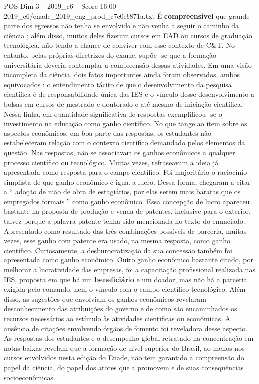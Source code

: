\begin{textsample}{POS Dim 3 – 2019\_c6 – Score 16.00 – 2019\_c6/enade\_2019\_eng\_prod\_c7c0e9871a.txt}
É \textbf{compreensível} que grande parte dos egressos não tenha se envolvido e não venha a seguir o caminho da ciência ; além disso, muitos deles fizeram cursos em EAD ou cursos de graduação tecnológica, não tendo a chance de conviver com esse contexto de C\&T.
No entanto, pelas próprias diretrizes do exame, supõe -se que a formação universitária deveria contemplar a compreensão dessas atividades.
Em uma visão incompleta da ciência, dois fatos importantes ainda foram observados, ambos equivocados : o entendimento tácito de que o desenvolvimento da pesquisa científica é de responsabilidade única das IES e o vínculo desse desenvolvimento a bolsas em cursos de mestrado e doutorado e até mesmo de iniciação científica.
Nessa linha, em quantidade significativa de respostas exemplificou -se o investimento na educação como ganho científico.
No que tange ao item sobre os aspectos econômicos, em boa parte das respostas, os estudantes não estabeleceram relação com o contexto científico demandado pelos elementos da questão.
Nas respostas, não se associavam os ganhos econômicos a qualquer processo científico ou tecnológico.
Muitas vezes, refraseavam a ideia já apresentada como resposta para o campo científico.
Foi majoritário o raciocínio simplista de que ganho econômico é igual a lucro.
Dessa forma, chegaram a citar a “ adoção de mão de obra de estagiários, por elas serem mais baratas que os empregados formais ” como ganho econômico.
Essa concepção de lucro apareceu bastante na proposta de produção e venda de patentes, inclusive para o exterior, talvez porque a palavra patente tenha sido mencionada no texto do enunciado.
Apresentado como resultado das três combinações possíveis de parceria, muitas vezes, esse ganho com patente era usado, na mesma resposta, como ganho científico.
Curiosamente, a desburocratização da sua concessão também foi apresentada como ganho econômico.
Outro ganho econômico bastante citado, por melhorar a lucratividade das empresas, foi a capacitação profissional realizada nas IES, proposta em que há um \textbf{beneficiário} e um doador, mas não há a parceria exigida pelo comando, nem o vínculo com o campo científico tecnológico.
Além disso, as sugestões que envolviam os ganhos econômicos revelaram desconhecimento das atribuições do governo e de como são encaminhados os recursos necessários ao estímulo às atividades cientificas ou econômicas.
A ausência de citações envolvendo órgãos de fomento foi reveladora desse aspecto.
As respostas dos estudantes e o desempenho global retratado na concentração em notas baixas revelam que a formação de nível superior do Brasil, ao menos nos cursos envolvidos nesta edição do Enade, não tem garantido a compreensão do papel da ciência, do papel dos atores que a promovem e de suas consequências socioeconômicas.

\end{textsample}
